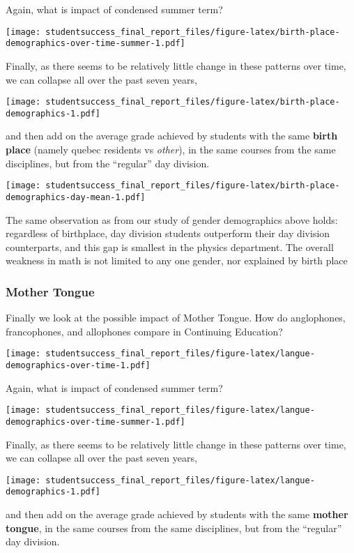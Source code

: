 \documentclass[]{book}
\theoremstyle{definition}
\theoremstyle{definition}
\theoremstyle{remark}
\begin{document}
Again, what is impact of condensed summer term?

\texttt{[image: studentsuccess\_final\_report\_files/figure-latex/birth-place-demographics-over-time-summer-1.pdf]}

Finally, as there seems to be relatively little change in these patterns
over time, we can collapse all over the past seven years,

\texttt{[image: studentsuccess\_final\_report\_files/figure-latex/birth-place-demographics-1.pdf]}

and then add on the average grade achieved by students with the same
\textbf{birth place} (namely quebec residents vs \emph{other}), in the
same courses from the same disciplines, but from the ``regular'' day
division.

\texttt{[image: studentsuccess\_final\_report\_files/figure-latex/birth-place-demographics-day-mean-1.pdf]}

The same observation as from our study of gender demographics above
holds: regardless of birthplace, day division students outperform their
day division counterparts, and this gap is smallest in the physics
department. The overall weakness in math is not limited to any one
gender, nor explained by birth place

\subsubsection{Mother Tongue}\label{mother-tongue}

Finally we look at the possible impact of Mother Tongue. How do
anglophones, francophones, and allophones compare in Continuing
Education?

\texttt{[image: studentsuccess\_final\_report\_files/figure-latex/langue-demographics-over-time-1.pdf]}

Again, what is impact of condensed summer term?

\texttt{[image: studentsuccess\_final\_report\_files/figure-latex/langue-demographics-over-time-summer-1.pdf]}

Finally, as there seems to be relatively little change in these patterns
over time, we can collapse all over the past seven years,

\texttt{[image: studentsuccess\_final\_report\_files/figure-latex/langue-demographics-1.pdf]}

and then add on the average grade achieved by students with the same
\textbf{mother tongue}, in the same courses from the same disciplines,
but from the ``regular'' day division.
\end{document}
